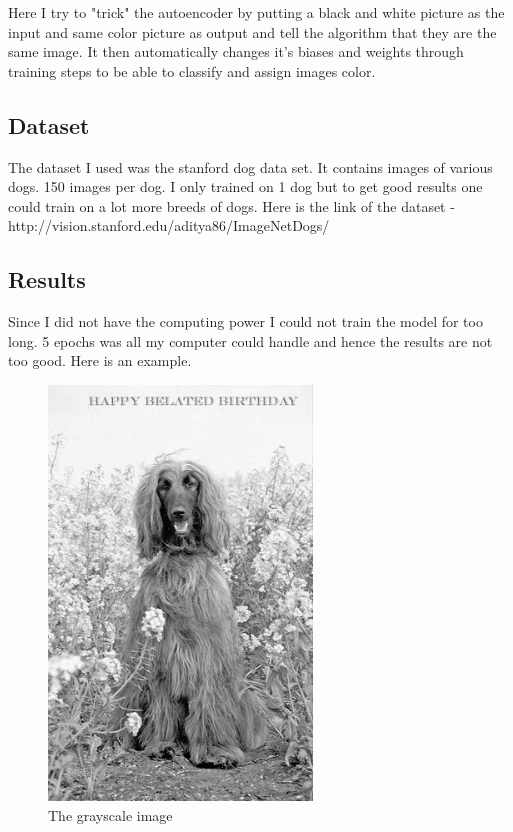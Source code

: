 \documentclass[12pt]{article} %
\begin{document}
Here I try to "trick" the autoencoder by putting a black and white picture as the input and same color picture as output and tell the algorithm that they are the same image. It then automatically changes it's biases and weights through training steps to be able to classify and assign images color.

\subsection{Dataset}
The dataset I used was the stanford dog data set. It contains images of various dogs. 150 images per dog. I only trained on 1 dog but to get good results one could train on a lot more breeds of dogs. Here is the link of the dataset - http://vision.stanford.edu/aditya86/ImageNetDogs/
\subsection{Results}
Since I did not have the computing power I could not train the model for too long. 5 epochs was all my computer could handle and hence the results are not too good. Here is an example. 

\begin{figure}[H]
\centering
\includegraphics[width=70mm]{../please.png}
\caption{The grayscale image \label{overflow}}
\end{figure}
\end{document}

